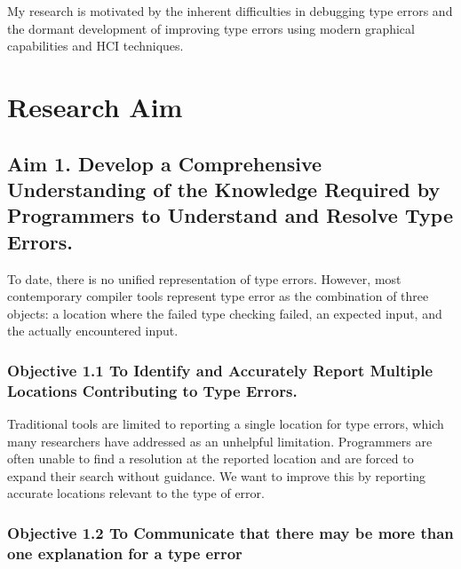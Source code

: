 

My research is motivated by the inherent difficulties in debugging type errors and the dormant development of improving type errors using modern graphical capabilities and HCI techniques.

\section{Research Aim}

\subsection{Aim 1. Develop a Comprehensive Understanding of the Knowledge Required by Programmers to Understand and Resolve Type Errors.}

To date, there is no unified representation of type errors. However, most contemporary compiler tools represent type error as the combination of three objects: a location where the failed type checking failed, an expected input, and the actually encountered input.

\subsubsection{Objective 1.1 To Identify and Accurately Report Multiple Locations Contributing to Type Errors.}

Traditional tools are limited to reporting a single location for type errors, which many researchers have addressed as an unhelpful limitation. Programmers are often unable to find a resolution at the reported location and are forced to expand their search without guidance. We want to improve this by reporting accurate locations relevant to the type of error.

\subsubsection{Objective 1.2 To Communicate that there may be more than one explanation for a type error}

